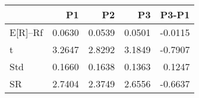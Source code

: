 \begin{tabular}{lrrrr}
\toprule
 & P1 & P2 & P3 & P3-P1 \\
\midrule
E[R]--Rf & 0.0630 & 0.0539 & 0.0501 & -0.0115 \\
t & 3.2647 & 2.8292 & 3.1849 & -0.7907 \\
Std & 0.1660 & 0.1638 & 0.1363 & 0.1247 \\
SR & 2.7404 & 2.3749 & 2.6556 & -0.6637 \\
\bottomrule
\end{tabular}
